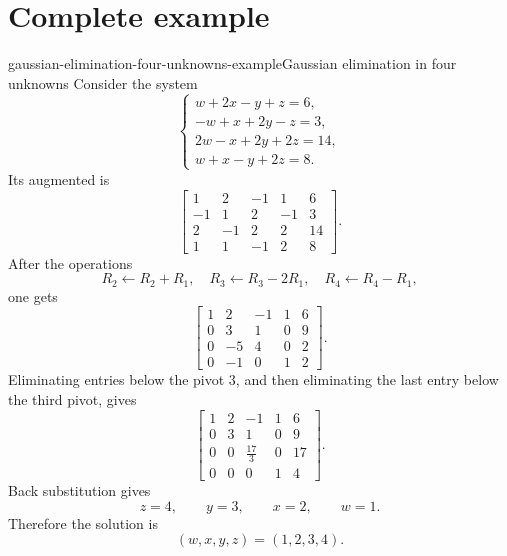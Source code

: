 \documentclass[preview]{standalone}
\begin{document}
\section{Complete example}

\begin{snippetexample}{gaussian-elimination-four-unknowns-example}{Gaussian elimination in four unknowns}
    Consider the system
    \[
        \begin{cases}
            w+2x-y+z=6,\\
            -w+x+2y-z=3,\\
            2w-x+2y+2z=14,\\
            w+x-y+2z=8.
        \end{cases}
    \]
    Its augmented \matrix is
    \[
        \left[
            \begin{array}{rrrr|r}
                1 & 2 & -1 & 1 & 6\\
                -1 & 1 & 2 & -1 & 3\\
                2 & -1 & 2 & 2 & 14\\
                1 & 1 & -1 & 2 & 8
            \end{array}
        \right].
    \]
    After the operations
    \[
        R_2\leftarrow R_2+R_1,
        \quad
        R_3\leftarrow R_3-2R_1,
        \quad
        R_4\leftarrow R_4-R_1,
    \]
    one gets
    \[
        \left[
            \begin{array}{rrrr|r}
                1 & 2 & -1 & 1 & 6\\
                0 & 3 & 1 & 0 & 9\\
                0 & -5 & 4 & 0 & 2\\
                0 & -1 & 0 & 1 & 2
            \end{array}
        \right].
    \]
    Eliminating entries below the pivot \(3\), and then eliminating the last
    entry below the third pivot, gives
    \[
        \left[
            \begin{array}{rrrr|r}
                1 & 2 & -1 & 1 & 6\\
                0 & 3 & 1 & 0 & 9\\
                0 & 0 & \frac{17}{3} & 0 & 17\\
                0 & 0 & 0 & 1 & 4
            \end{array}
        \right].
    \]
    Back substitution gives
    \[
        z=4,
        \qquad
        y=3,
        \qquad
        x=2,
        \qquad
        w=1.
    \]
    Therefore the solution is
    \[
        (w,x,y,z)=(1,2,3,4).
    \]
\end{snippetexample}
\end{document}
